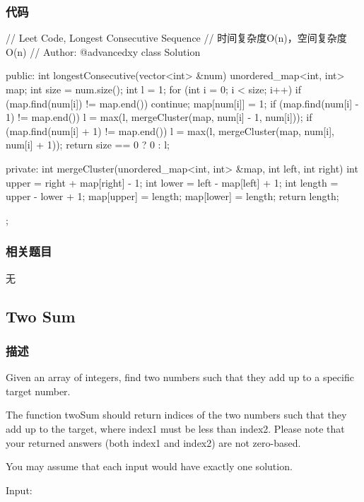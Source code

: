 \subsubsection{代码}

\begin{Code}
	// Leet Code, Longest Consecutive Sequence
	// 时间复杂度O(n)，空间复杂度O(n)
	// Author: @advancedxy
	class Solution {
		public:
		int longestConsecutive(vector<int> &num) {
			unordered_map<int, int> map;
			int size = num.size();
			int l = 1;
			for (int i = 0; i < size; i++) {
				if (map.find(num[i]) != map.end()) continue;
				map[num[i]] = 1;
				if (map.find(num[i] - 1) != map.end()) {
					l = max(l, mergeCluster(map, num[i] - 1, num[i]));
				}
				if (map.find(num[i] + 1) != map.end()) {
					l = max(l, mergeCluster(map, num[i], num[i] + 1));
				}
			}
			return size == 0 ? 0 : l;
		}
		
		private:
		int mergeCluster(unordered_map<int, int> &map, int left, int right) {
			int upper = right + map[right] - 1;
			int lower = left - map[left] + 1;
			int length = upper - lower + 1;
			map[upper] = length;
			map[lower] = length;
			return length;
		}
	};
\end{Code}

\subsubsection{相关题目}
\begindot
\item 无
\myenddot


\subsection{Two Sum} %
\label{sec:Two-sum}


\subsubsection{描述}
Given an array of integers, find two numbers such that they add up to a 
specific target number.

The function twoSum should return indices of the two numbers such that they add 
up to the target, where index1 must be less than index2. Please note that your 
returned answers (both index1 and index2) are not zero-based.

You may assume that each input would have exactly one solution.

Input:  

